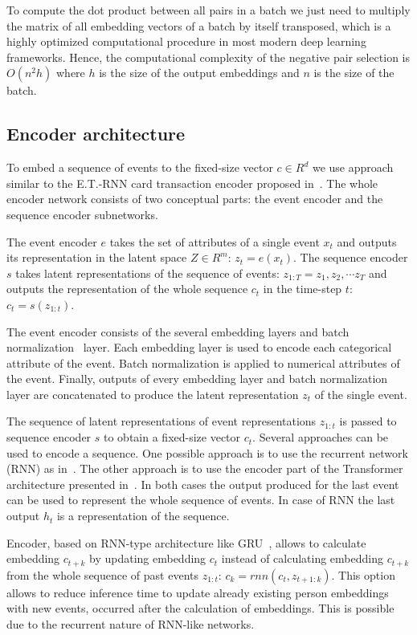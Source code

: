 \documentclass{article}
\begin{document}
To compute the dot product between all pairs in a batch we just need to multiply the matrix of all embedding vectors of a batch by itself transposed, which is a highly optimized computational procedure in most modern deep learning frameworks. Hence, the computational complexity of the negative pair selection is $O(n^2h)$ where $h$ is the size of the output embeddings and $n$ is the size of the batch.

\subsection{Encoder architecture} \label{sec-enc-arch}

To embed a sequence of events to the fixed-size vector $c \in R^d$ we use approach similar to the E.T.-RNN card transaction encoder proposed in~\cite{Babaev2019ETRNNAD}. The whole encoder network consists of two conceptual parts: the event encoder and the sequence encoder subnetworks.

The event encoder $e$ takes the set of attributes of a single event $x_t$ and outputs its representation in the latent space $Z \in R^m$: $z_t = e(x_t)$. The sequence encoder $s$ takes latent representations of the sequence of events: $ z_{1:T} = z_1, z_2, \cdots z_T $ and outputs the representation of the whole sequence $c_t$ in the time-step $t$: $ c_t = s(z_{1:t}) $.

The event encoder consists of the several embedding layers and batch normalization~\cite{Babaev2019ETRNNAD} layer. Each embedding layer is used to encode each categorical attribute of the event. Batch normalization is applied to numerical attributes of the event. Finally, outputs of every embedding layer and batch normalization layer are concatenated to produce the latent representation $z_t$ of the single event.

The sequence of latent representations of event representations $z_{1:t}$ is passed to sequence encoder $s$ to obtain a fixed-size vector $c_t$. Several approaches can be used to encode a sequence. One possible approach is to use the recurrent network (RNN) as in~\cite{Sutskever2014SequenceTS}. The other approach is to use the encoder part of the Transformer architecture presented in~\cite{Vaswani2017AttentionIA}. In both cases the output produced for the last event can be used to represent the whole sequence of events. In case of RNN the last output $h_t$ is a representation of the sequence.

Encoder, based on RNN-type architecture like GRU~\cite{Cho2014LearningPR}, allows to calculate embedding $c_{t+k}$ by updating embedding $c_t$ instead of  calculating embedding $c_{t+k}$ from the whole sequence of past events $z_{1:t}$: $c_k = rnn(c_t, z_{t+1:k})$. This option allows to reduce inference time to update already existing person embeddings with new events, occurred after the calculation of embeddings. This is possible due to the recurrent nature of RNN-like networks.
\end{document}
